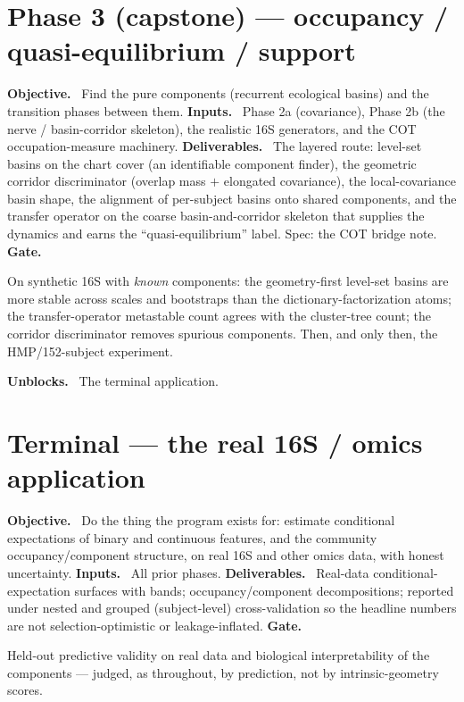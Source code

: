 \documentclass[11pt]{article}
\newcommand{\field}[1]{\smallskip\noindent\textbf{\textsf{#1.}}\ }
\begin{document}
\section{Phase 3 (capstone) --- occupancy / quasi-equilibrium / support}\label{sec:phase3}

\field{Objective} Find the pure components (recurrent ecological basins) and the
transition phases between them.
\field{Inputs} Phase 2a (covariance), Phase 2b (the nerve / basin-corridor
skeleton), the realistic 16S generators, and the COT occupation-measure machinery.
\field{Deliverables} The layered route: level-set basins on the chart cover (an
identifiable component finder), the geometric corridor discriminator (overlap mass
$+$ elongated covariance), the local-covariance basin shape, the alignment of
per-subject basins onto shared components, and the transfer operator on the coarse
basin-and-corridor skeleton that supplies the dynamics and earns the
``quasi-equilibrium'' label. Spec: the COT bridge note.
\field{Gate} \begin{gate} On synthetic 16S with \emph{known} components: the
geometry-first level-set basins are more stable across scales and bootstraps than
the dictionary-factorization atoms; the transfer-operator metastable count agrees
with the cluster-tree count; the corridor discriminator removes spurious components.
Then, and only then, the HMP/152-subject experiment.\end{gate}
\field{Unblocks} The terminal application.

\section{Terminal --- the real 16S / omics application}\label{sec:terminal}

\field{Objective} Do the thing the program exists for: estimate conditional
expectations of binary and continuous features, and the community
occupancy/component structure, on real 16S and other omics data, with honest
uncertainty.
\field{Inputs} All prior phases.
\field{Deliverables} Real-data conditional-expectation surfaces with bands;
occupancy/component decompositions; reported under nested and grouped (subject-level)
cross-validation so the headline numbers are not selection-optimistic or
leakage-inflated.
\field{Gate} \begin{gate} Held-out predictive validity on real data and biological
interpretability of the components --- judged, as throughout, by prediction, not by
intrinsic-geometry scores.\end{gate}
\end{document}
